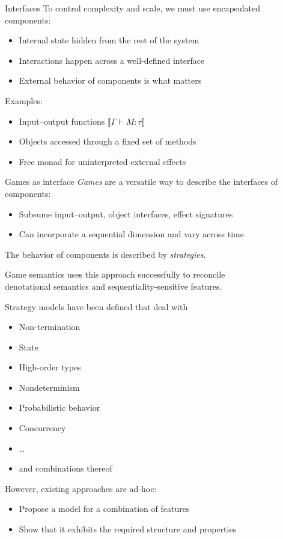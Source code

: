 \documentclass[aspectratio=1610,mathserif]{beamer}
\begin{document}
\begin{frame}{Interfaces}
  To control complexity and scale, we must use encapsulated components:
  \begin{itemize}
    \item Internal state hidden from the rest of the system
    \item Interactions happen across a well-defined interface
    \item External behavior of components is what matters
  \end{itemize}

  \vspace{1ex}
  Examples:
  \begin{itemize}
    \item Input--output functions $\llbracket \Gamma \vdash M : \tau \rrbracket$
    \item Objects accessed through a fixed set of methods
    \item Free monad for uninterpreted external effects
  \end{itemize}
\end{frame}

\begin{frame}{Games as interface}
  \emph{Games} are a versatile way to describe the interfaces of components:
  \begin{itemize}
    \item Subsume input--output, object interfaces, effect signatures
    \item Can incorporate a sequential dimension and vary across time
  \end{itemize}
  The behavior of components is described by \emph{strategies}.

  \vspace{1em}
  Game semantics uses this approach successfully
  to reconcile \\ denotational semantics and
  sequentiality-sensitive features.
\end{frame}

\begin{frame}
  Strategy models have been defined that deal with
  \begin{itemize}
    \item Non-termination
    \item State
    \item High-order types
    \item Nondeterminism
    \item Probabilistic behavior
    \item Concurrency
    \item \ldots
    \item and combinations thereof
  \end{itemize}

  \vspace{1em}
  However, existing approaches are ad-hoc:
  \begin{itemize}
    \item Propose a model for a combination of features
    \item Show that it exhibits the required structure and properties
  \end{itemize}
\end{frame}
\end{document}
